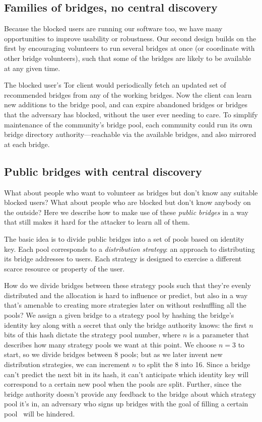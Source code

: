 \documentclass{llncs}
\begin{document}
\subsection{Families of bridges, no central discovery}

Because the blocked users are running our software too, we have many
opportunities to improve usability or robustness. Our second design builds
on the first by encouraging volunteers to run several bridges at once
(or coordinate with other bridge volunteers), such that some
of the bridges are likely to be available at any given time.

The blocked user's Tor client would periodically fetch an updated set of
recommended bridges from any of the working bridges. Now the client can
learn new additions to the bridge pool, and can expire abandoned bridges
or bridges that the adversary has blocked, without the user ever needing
to care. To simplify maintenance of the community's bridge pool, each
community could run its own bridge directory authority---reachable via
the available bridges, and also mirrored at each bridge.

\subsection{Public bridges with central discovery}

What about people who want to volunteer as bridges but don't know any
suitable blocked users? What about people who are blocked but don't
know anybody on the outside? Here we describe how to make use of these
\emph{public bridges} in a way that still makes it hard for the attacker
to learn all of them.

The basic idea is to divide public bridges into a set of pools based on
identity key. Each pool corresponds to a \emph{distribution strategy}:
an approach to distributing its bridge addresses to users. Each strategy
is designed to exercise a different scarce resource or property of
the user.

How do we divide bridges between these strategy pools such that they're
evenly distributed and the allocation is hard to influence or predict,
but also in a way that's amenable to creating more strategies later
on without reshuffling all the pools? We assign a given bridge
to a strategy pool by hashing the bridge's identity key along with a
secret that only the bridge authority knows: the first $n$ bits of this
hash dictate the strategy pool number, where $n$ is a parameter that
describes how many strategy pools we want at this point. We choose $n=3$
to start, so we divide bridges between 8 pools; but as we later invent
new distribution strategies, we can increment $n$ to split the 8 into
16. Since a bridge can't predict the next bit in its hash, it can't
anticipate which identity key will correspond to a certain new pool
when the pools are split. Further, since the bridge authority doesn't
provide any feedback to the bridge about which strategy pool it's in,
an adversary who signs up bridges with the goal of filling a certain
pool~\cite{casc-rep} will be hindered.
\end{document}
